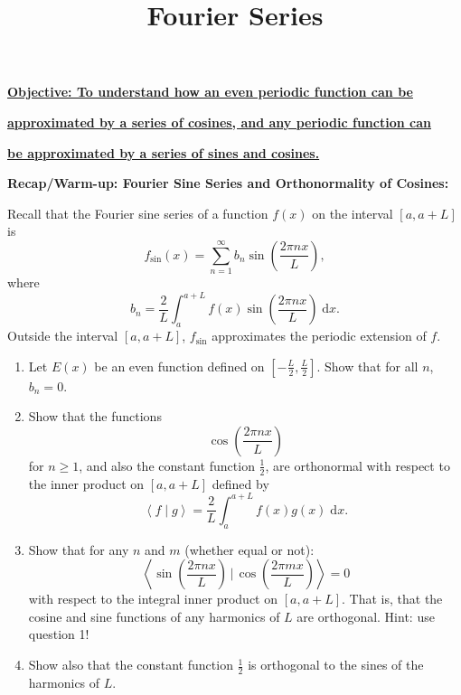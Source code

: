 \documentclass{article}
\newcommand{\diff}{\;\mathrm{d}}
\newcommand{\braket}[2]{\left\langle #1 \mid #2 \right\rangle}
\begin{document}
\title{Fourier Series}
\date{}

\maketitle
\thispagestyle{empty}

\Large

\textbf{\underline{Objective: To understand how an even periodic function can be}}

\textbf{\underline{approximated by a series of cosines, and any periodic function can}}

\textbf{\underline{be approximated by a series of sines and cosines.}}






\vspace{5mm}



\textbf{Recap/Warm-up: Fourier Sine Series and Orthonormality of Cosines:}\bigskip



Recall that the Fourier sine series of a function $f(x)$ on the interval $[a,a+L]$ is
\[f_\mathrm{sin}(x)=\sum_{n=1}^\infty b_n\sin\left(\frac{2\pi nx}{L}\right),\]
where
\[b_n=\frac{2}{L}\int_a^{a+L} f(x)\sin\left(\frac{2\pi nx}{L}\right)\diff x.\]
Outside the interval $[a,a+L]$, $f_\mathrm{sin}$ approximates the periodic extension of $f$.\bigskip


\begin{enumerate}
	\item Let $E(x)$ be an even function defined on $\left[-\frac{L}{2},\frac{L}{2}\right]$. Show that for all $n$, $b_n=0$.
	\item Show that the functions
		\[\cos\left(\frac{2\pi nx}{L}\right)\]
		for $n\geq 1$, and also the constant function $\frac{1}{2}$, are orthonormal with respect to the inner product on $[a,a+L]$ defined by
		\[\braket{f}{g}=\frac{2}{L}\int_a^{a+L}\!\!\! f(x)g(x)\diff x.\]
	\item Show that for any $n$ and $m$ (whether equal or not):
		\[\left\langle \sin\left(\frac{2\pi nx}{L}\right)\,\Bigg|\,\cos\left(\frac{2\pi mx}{L}\right)\right\rangle=0\]
		with respect to the integral inner product on $[a,a+L]$. That is, that the cosine and sine functions of any harmonics of $L$ are orthogonal. Hint: use question 1!
	\item Show also that the constant function $\frac{1}{2}$ is orthogonal to the sines of the harmonics of $L$.
\end{enumerate}
\end{document}
